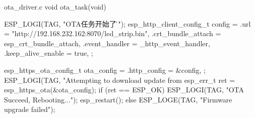 \documentclass[lang=cn,newtx,10pt,scheme=chinese]{elegantbook}
\begin{document}
\begin{mycode}{ota\_driver.c}
void ota_task(void)
{
    ESP_LOGI(TAG, "OTA任务开始了。\r\n");
    esp_http_client_config_t config = {
        .url = "http://192.168.232.162:8070/led_strip.bin",
        .crt_bundle_attach = esp_crt_bundle_attach,
        .event_handler = _http_event_handler,
        .keep_alive_enable = true,
    };

    esp_https_ota_config_t ota_config = {
        .http_config = &config,
    };
    ESP_LOGI(TAG, "Attempting to download update from %
    esp_err_t ret = esp_https_ota(&ota_config);
    if (ret == ESP_OK)
    {
        ESP_LOGI(TAG, "OTA Succeed, Rebooting...");
        esp_restart();
    }
    else
    {
        ESP_LOGE(TAG, "Firmware upgrade failed");
    }
}
\end{mycode}
\end{document}
